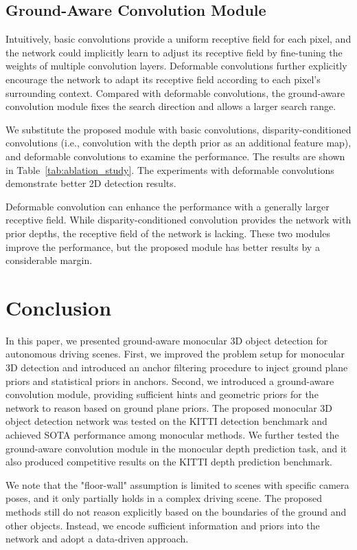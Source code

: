 \documentclass[letterpaper, 10 pt, journal, twoside]{IEEEtran}
\begin{document}
\subsection{Ground-Aware Convolution Module}
Intuitively, basic convolutions provide a uniform receptive field for each pixel, and the network could implicitly learn to adjust its receptive field by fine-tuning the weights of multiple convolution layers. Deformable convolutions \cite{Zhu2018Deformv2} further explicitly encourage the network to adapt its receptive field according to each pixel's surrounding context. Compared with deformable convolutions, the ground-aware convolution module fixes the search direction and allows a larger search range.

We substitute the proposed module with basic convolutions, disparity-conditioned convolutions (i.e., convolution with the depth prior as an additional feature map), and deformable convolutions to examine the performance.
The results are shown in Table~\ref{tab:ablation_study}. The experiments with deformable convolutions demonstrate better 2D detection results. 

Deformable convolution can enhance the performance with a generally larger receptive field. While disparity-conditioned convolution provides the network with prior depths, the receptive field of the network is lacking. These two modules improve the performance, but the proposed module has better results by a considerable margin.

 \section{Conclusion}
\label{section:Conclusion}

In this paper, we presented ground-aware monocular 3D object detection for autonomous driving scenes. 
First, we improved the problem setup for monocular 3D detection and introduced an anchor filtering procedure to inject ground plane priors and statistical priors in anchors.
Second, we introduced a ground-aware convolution module, providing sufficient hints and geometric priors for the network to reason based on ground plane priors.
The proposed monocular 3D object detection network was tested on the KITTI detection benchmark and achieved SOTA performance among monocular methods. We further tested the ground-aware convolution module in the monocular depth prediction task, and it also produced competitive results on the KITTI depth prediction benchmark.

We note that the "floor-wall" assumption is limited to scenes with specific camera poses, and it only partially holds in a complex driving scene. The proposed methods still do not reason explicitly based on the boundaries of the ground and other objects. Instead, we encode sufficient information and priors into the network and adopt a data-driven approach.
\end{document}

